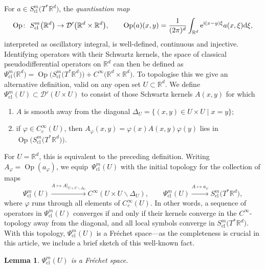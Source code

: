 \documentclass[10pt,a4paper]{amsart}
\numberwithin{equation}{section}
\newtheorem{Lemma}[Theorem]{Lemma}
\theoremstyle{definition}
\newcommand{\R}{\mathbb{R}} %
\newcommand{\1}{{\bf 1}}
\DeclareMathOperator{\Op}{Op}
\newcommand{\cl}{\mathrm{cl}}
\begin{document}
For $a\in S^m_\cl\bigl(T^*\R^d\bigr)$, the {\it quantisation map}
\[
	\Op\colon\ S^m_\cl\bigl(\R^d\bigr)\rightarrow \mathcal D'\bigl(\R^d\times \R^d\bigr),\qquad \Op(a)(x,y)=
	\frac 1{(2\pi)^d} \int_{\R^d}{\rm e}^{{\rm i}(x-y)\xi}a(x,\xi) {{\rm d}\xi},
\]	
interpreted as oscillatory integral, is well-defined, continuous and injective. Identifying operators with their Schwartz kernels, the space of classical pseudodifferential operators on $\R^d$ can then be defined as
$\Psi^m_\cl\bigl(\R^d\bigr) = \Op\bigl(S^m_\cl\bigl(T^*\R^d\bigr)\bigr) + C^\infty\bigl(\R^d\times \R^d\bigr)$.
To topologise this we give an alternative definition, valid on any open set $U\subset \R^d$. We define $\Psi^m_\cl(U)\subset \mathcal D'(U\times U)$ to consist of those Schwartz kernels $A(x,y)$ for which
\begin{enumerate}[label=(\alph*)]\itemsep=0pt
	\item $A$ is smooth away from the diagonal $\Delta_U=\{(x,y)\in U\times U\mid x=y\}$;
	
	\item if $\varphi \in C_c^\infty(U)$, then $A_\varphi(x,y)=\varphi(x)A(x,y)\varphi(y)$ lies in $\Op\bigl(S^m_\cl\bigl(T^*\R^d\bigr)\bigr)$.
\end{enumerate}
For $U=\R^d$, this is equivalent to the preceding definition.
Writing $A_\varphi=\Op(a_\varphi)$, we equip~$\Psi^m_\cl(U)$ with the initial topology for the collection of maps
\begin{equation}\label{toppsido}
	\Psi^m_\cl(U)\xrightarrow{A\mapsto A\vert_{U\times U\backslash \Delta_U}} C^\infty(U\times U\backslash \Delta_U),\qquad \Psi^m_\cl(U)\xrightarrow{A\mapsto a_\varphi} S^m_\cl\bigl(T^*\R^d\bigr),
\end{equation}
where $\varphi$ runs through all elements of $C_c^\infty(U)$. In other words, a sequence of operators in $\Psi^m_\cl(U)$ converges if and only if their kernels converge in the $C^\infty$-topology away from the diagonal, and all local symbols converge in $S^m_\cl\bigl(T^*\R^d\bigr)$.
With this topology, $\Psi^m_\cl(U)$ is a Fr{\'e}chet space---as the completeness is crucial in this article, we include a brief sketch of this well-known fact.

\begin{Lemma}
	$\Psi_\cl^m(U)$ is a Fr{\'e}chet space.
\end{Lemma}
\end{document}
